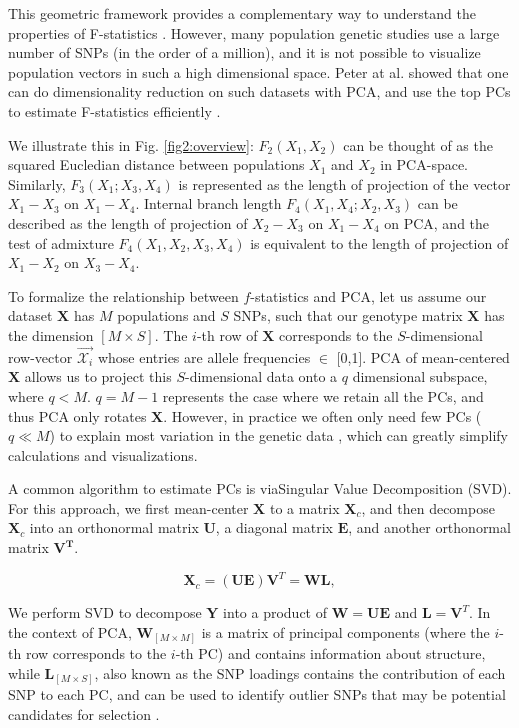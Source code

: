\documentclass[12pt, letterpaper]{article}
\newcommand{\MX}{\mathbf{X}}
\begin{document}
This geometric framework provides a complementary way to understand the properties of F-statistics \cite{oteo-garcia_geometrical_2021}. However, many population genetic studies use a large number of SNPs (in the order of a million), and it is not possible to visualize population vectors in such a high dimensional space. Peter at al. showed that one can do dimensionality reduction on such datasets with PCA, and use the top PCs to estimate F-statistics efficiently \cite{peter_geometric_2022}.

We illustrate this in Fig. \ref{fig2:overview}:  $F_2(X_1,X_2)$ can be thought of as the squared Eucledian distance between populations $X_1$ and $X_2$ in PCA-space. Similarly, $F_3(X_1;X_3,X_4)$ is represented as the length of projection of the vector $X_1-X_3$ on $X_1-X_4$. Internal branch length $F_4(X_1,X_4;X_2,X_3)$ can be described as the length of projection of $X_2-X_3$ on $X_1-X_4$ on PCA, and the test of admixture $F_4(X_1,X_2,X_3,X_4)$ is equivalent to the length of projection of $X_1-X_2$ on $X_3-X_4$. 


To formalize the relationship between $f$-statistics and PCA, let us assume our dataset $\mathbf{X}$ has $M$ populations and $S$ SNPs, such that our genotype matrix $\MX$ has the dimension $[M \times S]$. The $i$-th row of $\MX$ corresponds to the $S$-dimensional row-vector $\Vec{\mathcal{X}_i}$ whose entries are  allele frequencies $\in$ [0,1]. PCA of mean-centered $\MX$ allows us to project this $S$-dimensional data onto a $q$ dimensional subspace, where $q < M$. $q = M-1$ represents the case where we retain all the PCs, and thus PCA only rotates $\MX$. However, in practice we often only need few PCs ($q \ll M$) to explain most variation in the genetic data \cite{peter_geometric_2022}, which can greatly simplify calculations and visualizations. 

A common algorithm to estimate PCs is viaSingular Value Decomposition (SVD). For this approach, we first mean-center $\MX$ to a  matrix $\MX_c$, and then decompose $\MX_c$ into an orthonormal matrix $\mathbf{U}$, a diagonal matrix $\mathbf{E}$, and another orthonormal matrix $\mathbf{V^T}$.

$$\MX_c = (\mathbf{U}\mathbf{E}) \mathbf{V}^T = \mathbf{WL},$$

 We perform SVD to decompose $\mathbf{Y}$ into a product of $\mathbf{W} = \mathbf{UE}$ and $\mathbf{L} = \mathbf{V}^T$. In the context of PCA, $\mathbf{W}_{[M\times M]}$ is a matrix of principal components (where the $i$-th row corresponds to the $i$-th PC) and contains information about structure, while $\mathbf{L}_{[M\times S]}$, also known as the SNP loadings contains the contribution of each SNP to each PC, and can be used to identify outlier SNPs that may be potential candidates for selection \cite{gower_distance_1966}. 
\end{document}

